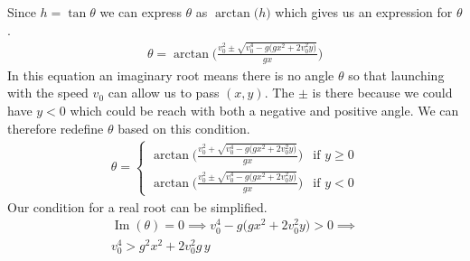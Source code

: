 \documentclass[%
aip,
jmp,
amsmath,amssymb,
reprint,%
]{revtex4-1}
\begin{document}
	Since $h=\tan\theta$ we can express $\theta$ as $\arctan\big(h\big)$ which gives us an expression for $\theta$.
	\begin{align}\nonumber
		\theta=\arctan\Bigg(\frac{v_{0}^2\pm\sqrt{v_{0}^4-g\big(gx^2+2v_{0}^2y\big)}}{gx}\Bigg)\end{align}
	In this equation an imaginary root means there is no angle $\theta$ so that launching with the speed $v_0$ can allow us to pass $(x,y)$. The $\pm$ is there because we could have $y < 0$ which could be reach with both a negative and positive angle. We can therefore redefine $\theta$ based on this condition.
	\begin{align}\nonumber
		\theta = 
		\begin{cases}
			\arctan\Bigg(\frac{v_{0}^2+\sqrt{v_{0}^4-g\big(gx^2+2v_{0}^2y\big)}}{gx}\Bigg)	&\text{if } y \geq 0 \\
			\arctan\Bigg(\frac{v_{0}^2\pm\sqrt{v_{0}^4-g\big(gx^2+2v_{0}^2y\big)}}{gx}\Bigg)	&\text{if } y < 0
		\end{cases}
	\end{align}
	Our condition for a real root can be simplified.
	\begin{align}\nonumber
		\operatorname{Im}(\theta) = 0 \implies v_{0}^4-g\big(gx^2+2v_{0}^2y\big) > 0 \implies \\\nonumber
		v_{0}^4 > g^2x^2 +2v_{0}^2g\,y
	\end{align}
\end{document}
